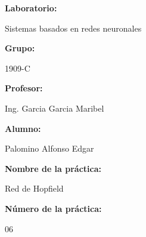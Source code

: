 \documentclass[a4paper]{article}
\begin{document}
    \begin{titlepage}
        \centering
        \par\vspace{0.5cm}

        \par\vspace{1cm}

        \raggedright{\huge\textbf{Laboratorio:}}
        \par\vspace{0.5cm}
        \centering
        {\huge{Sistemas basados en redes neuronales}}
        \par\vspace{0.5cm}

        \raggedright{\huge\textbf{Grupo:}}
        \par\vspace{0.5cm}
        \centering
        {\huge{1909-C}}
        \par\vspace{0.5cm}

        \raggedright{\huge\textbf{Profesor:}}
        \par\vspace{0.5cm}
        \centering
        {\huge{Ing. Garcia Garcia Maribel}}
        \par\vspace{0.5cm}

        \raggedright{\huge\textbf{Alumno:}}
        \par\vspace{0.5cm}
        \centering
        {\huge{Palomino Alfonso Edgar}}
        \par\vspace{0.5cm}

        \raggedright{\huge\textbf{Nombre de la práctica:}}
        \par\vspace{0.5cm}
        \centering
        {\huge{Red de Hopfield}}
        \par\vspace{0.5cm}

        \raggedright{\huge\textbf{Número de la práctica:}}
        \par\vspace{0.5cm}
        \centering
        {\huge{06}}
        \par\vspace{0.5cm}


\end{titlepage}
\end{document}
